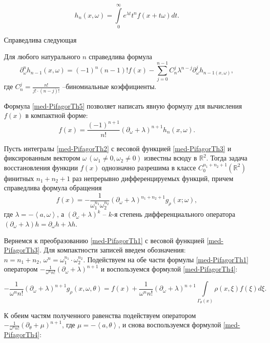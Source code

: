 $$h_n(x,\omega)=\int\limits_0^\infty e^{\lambda t}t^n f(x+t\omega)dt.$$

Справедлива следующая
\begin{lemma}
Для любого натурального $n$ справедлива формула
\begin{equation}
\label{med-PifagorTh5}
\partial_\omega^nh_{n-1}(x,\omega)=(-1)^n(n-1)!f(x)-\sum\limits_{j=0}^{n-1}C_n^j\lambda^{n-j}\partial_\omega^j h_{n-1(x,\omega)},
\end{equation}
где $C_n^j=\frac{n!}{j!\cdot(n-j)!}$ --биномиальные коэффициенты.
\end{lemma}

Формула \eqref{med-PifagorTh5} позволяет написать явную формулу для вычисления $f(x)$ в компактной форме:
$$ f(x)=\frac{(-1)^{n+1}}{n!}(\partial_\omega +\lambda)^{n+1}h_n(x,\omega).$$

\begin{theorem}
Пусть интегралы \eqref{med-PifagorTh2} с весовой функцией \eqref{med-PifagorTh3} и фиксированным вектором $\omega\, (\omega_1\neq0, \omega_2\neq0)$ известны всюду в $\mathbb R^2$. Тогда задача восстановления функции $f(x)$ однозначно разрешима в классе $C_0^{n_1+n_2+1}(\mathbb R^2)$ финитных $n_1+n_2+1$ раз непрерывно дифференцируемых функций, причем справедлива формула обращения
\begin{equation}
\label{med-PifagorTh4}
f(x)=-\frac{1}{\omega_1^{n_1}\omega_2^{n_2}}(\partial_\omega+\lambda)^{n_1+n_2+1} g_\rho(x;\omega),
\end{equation}
где $\lambda=-\left<a,\omega\right>$, а $(\partial_\omega+\lambda)^k$ -- $k$-я степень дифференциального оператора $(\partial_\omega+\lambda)h=\partial_\omega h+\lambda h$.
\end{theorem}

Вернемся к преобразованию \eqref{med-PifagorTh1} с весовой функцией \eqref{med-PifagorTh3}. Для компактности записей введем обозначения: $n=n_1+n_2, \, \omega^n=\omega_1^{n_1}\cdot\omega_2^{n_2}$. Подействуем на обе части формулы \eqref{med-PifagorTh1} оператором $-\frac{1}{\omega^n n!}(\partial_\omega +\lambda)^{n+1}$ и воспользуемся формулой \eqref{med-PifagorTh4}:

$$-\frac{1}{\omega^n n!}(\partial_\omega +\lambda)^{n+1}g_\rho(x,\omega,\theta)=f(x)+\frac{1}{\omega^n n!}(\partial_\omega +\lambda)^{n+1}\int\limits_{\Gamma_\theta(x)}\rho(x,\xi)f(\xi)d\xi.$$

К обеим частям полученного равенства подействуем оператором $-\frac{1}{\omega^n n!}(\partial_\theta +\mu)^{n+1}$, где $\mu=-\left<a,\theta\right>$, и снова воспользуемся формулой \eqref{med-PifagorTh4}:


